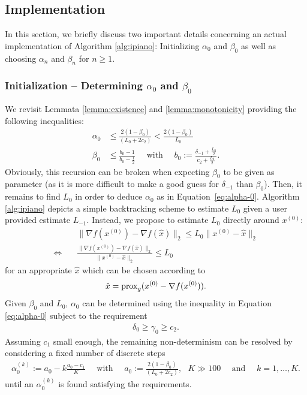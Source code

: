 \documentclass[onecolumn,final,a4paper,13pt,reqno]{siamart}
\DeclareRobustCommand{\prox}[1]{%
    \ifmmode
        \text{prox}_{#1}
    \else
        $\text{prox}_{#1}$
    \fi
}
\begin{document}
\subsection{Implementation}
\label{sec:implementation}

In this section, we briefly discuss two important details concerning an actual implementation of Algorithm \ref{alg:ipiano}: Initializing $\alpha_0$ and $\beta_0$ as well as choosing $\alpha_n$ and $\beta_n$ for $n \geq 1$.

\subsubsection{Initialization -- Determining $\alpha_0$ and $\beta_0$}

We revisit Lemmata \ref{lemma:existence} and \ref{lemma:monotonicity} providing the following inequalities:
\begin{align}
	\alpha_0 &\leq \frac{2(1 - \beta_0)}{(L_0 + 2 c_2)}\label{eq:alpha-0} < \frac{2(1 - \beta_0)}{L_0}\\
	\beta_0 &\leq \frac{b_0 - 1}{b_0 - \frac{1}{2}} \quad\text{ with }\quad b_0 := \frac{\delta_{-1} + \frac{L_0}{2}}{c_2 + \frac{L_0}{2}}.
\end{align}
Obviously, this recursion can be broken when expecting $\beta_0$ to be given as parameter (as it is more difficult to make a good guess for $\delta_{-1}$ than $\beta_0$). Then, it remains to find $L_0$ in order to deduce $\alpha_0$ as in Equation~\eqref{eq:alpha-0}. Algorithm \ref{alg:ipiano} depicts a simple backtracking scheme to estimate $L_0$ given a user provided estimate $L_{-1}$. Instead, we propose to estimate $L_0$ directly around $x^{(0)}$:
\begin{align}
	&\|\nabla f(x^{(0)}) - \nabla f(\hat{x})\|_2 \leq L_0 \|x^{(0)} - \hat{x}\|_2\\
	\Leftrightarrow\quad& \frac{\|\nabla f(x^{(0)}) - \nabla f(\hat{x})\|_2}{\|x^{(0)} - \hat{x}\|_2} \leq L_0\label{eq:estimate-L}
\end{align}
for an appropriate $\hat{x}$ which can be chosen according to
\begin{align}
	\hat{x} = \prox{g}(x^{(0)} - \nabla f(x^{(0)})).
\end{align}
Given $\beta_0$ and $L_0$, $\alpha_0$ can be determined using the inequality in Equation \eqref{eq:alpha-0} subject to the requirement
\begin{align}
	\delta_0 \geq \gamma_0 \geq c_2.
\end{align}
Assuming $c_1$ small enough, the remaining non-determinism can be resolved by considering a fixed number of discrete steps
\begin{align}
	\alpha_0^{(k)} := a_0 - k\frac{a_0 - c_1}{K}\quad\text{ with }\quad a_0 := \frac{2(1 - \beta_0)}{(L_0 + 2 c_2)},\text{ }K \gg 100\quad\text{ and }\quad k = 1,\ldots,K.
\end{align}
until an $\alpha_0^{(k)}$ is found satisfying the requirements.
\end{document}
